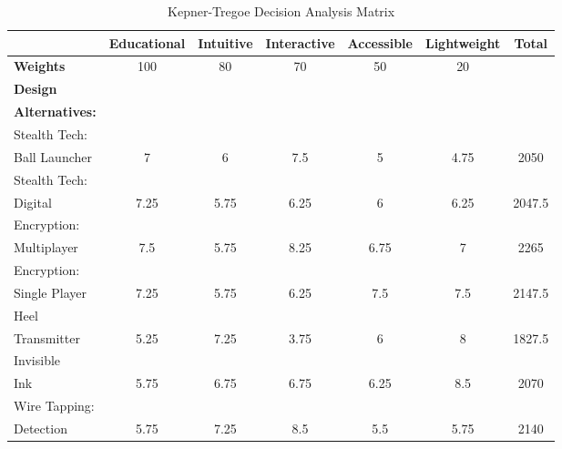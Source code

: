 \documentclass[conference]{IEEEtran}
\begin{document}
   \begin{table}[H]
     \centering
     \begin{tabular}{| l | c | c | c | c | c | c |}
       \hline
       \cellcolor{black} & Educational & Intuitive & Interactive & Accessible & Lightweight & Total\\
       \hline
       \textbf{Weights} & \cellcolor{red!40} 100 & \cellcolor{red!40} 80 & \cellcolor{red!40} 70 & \cellcolor{yellow!40} 50 & \cellcolor{green!40} 20 & \cellcolor{lightgray}\\
       \hline
       \textbf{Design} & \cellcolor{black} & \cellcolor{black} & \cellcolor{black} & \cellcolor{black} & \cellcolor{black} & \cellcolor{black}\\
       \textbf{Alternatives:} & \cellcolor{black} & \cellcolor{black} & \cellcolor{black} & \cellcolor{black} & \cellcolor{black} & \cellcolor{black}\\
       \hline
       Stealth Tech: & & & & & & \cellcolor{lightgray} \\
       Ball Launcher & 7 & 6 & 7.5 & 5 & 4.75 & \cellcolor{lightgray} 2050\\
       \hline
       Stealth Tech: & & & & & & \cellcolor{lightgray} \\
       Digital & 7.25 & 5.75 & 6.25 & 6 & 6.25 & \cellcolor{lightgray} 2047.5\\
       \hline
       \rowcolor{green!40} Encryption: & & & & & & \cellcolor{lightgray} \\
       \rowcolor{green!40} Multiplayer & 7.5 & 5.75 & 8.25 & 6.75 & 7 & \cellcolor{lightgray} 2265\\
       \hline
       Encryption: & & & & & & \cellcolor{lightgray} \\
       Single Player & 7.25 & 5.75 & 6.25 & 7.5 & 7.5 & \cellcolor{lightgray} 2147.5\\
       \hline
       Heel & & & & & & \cellcolor{lightgray} \\
       Transmitter & 5.25 & 7.25 & 3.75 & 6 & 8 & \cellcolor{lightgray} 1827.5\\
       \hline
       Invisible & & & & & & \cellcolor{lightgray} \\
       Ink & 5.75 & 6.75 & 6.75 & 6.25 & 8.5 & \cellcolor{lightgray} 2070\\
       \hline
       Wire Tapping: & & & & & & \cellcolor{lightgray} \\
       Detection & 5.75 & 7.25 & 8.5 & 5.5 & 5.75 & \cellcolor{lightgray} 2140\\
       \hline
     \end{tabular}
     \caption{Kepner-Tregoe Decision Analysis Matrix}
     \label{table:3}
   \end{table} \normalsize
\end{document}
